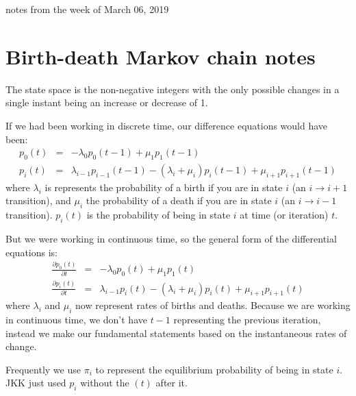 \documentclass[11pt]{article}
\newcommand{\birth}[1]{\lambda_{#1}}
\newcommand{\death}[1]{\mu_{#1}}
\begin{document}
notes from the week of March 06, 2019 \\
\tableofcontents


\section{Birth-death Markov chain notes}
The state space is the non-negative integers with the only possible changes in a single instant being
an increase or decrease of 1.

If we had been working in discrete time, our difference equations would have been:
\begin{eqnarray}
    p_0(t) & = & -\birth{0} p_0(t-1) + \death{1} p_1(t-1) \\
    p_i(t) & = & \birth{i-1} p_{i-1}(t-1) -\left(\birth{i} + \death{i}\right) p_i(t-1) + \death{i+1} p_{i+1}(t-1)
\end{eqnarray}
where $\birth{i}$ is represents the probability of a birth if you are in state $i$ (an $i\rightarrow i+1$ transition), and $\death{i}$ the probability of a death if you are in state $i$ (an $i\rightarrow i-1$ transition).
$p_{i}(t)$ is the probability of being in state $i$ at time (or iteration) $t$.


But we were working in continuous time, so the general form of the differential
equations is:
\begin{eqnarray}
    \frac{\partial p_0(t)}{\partial t} & = & -\birth{0} p_0(t) + \death{1} p_1(t) \label{diff0}\\
    \frac{\partial p_i(t)}{\partial t} & = & \birth{i-1} p_{i}(t) -\left(\birth{i} + \death{i}\right) p_i(t) + \death{i+1} p_{i+1}(t) \label{diffi}
\end{eqnarray}
where $\birth{i}$ and $\death{i}$ now represent rates of births and deaths.
Because we are working in continuous time, we don't have $t-1$ representing the previous iteration,
    instead we make our fundamental statements based on the instantaneous rates of change.


Frequently we use $\pi_i$ to represent the equilibrium probability of being in state $i$.
JKK just used $p_i$ without the $(t)$ after it.
\end{document}
